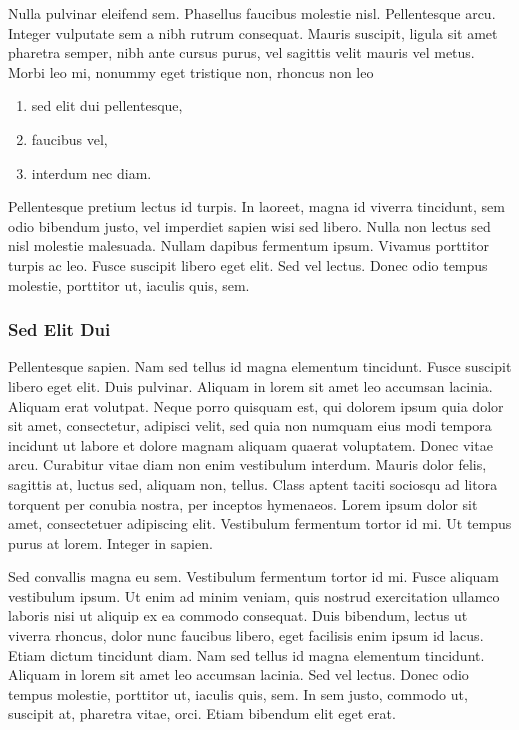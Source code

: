 \documentclass[english,master,dept460,male,cpp,cpdeclaration]{diploma}
\begin{document}
Nulla pulvinar eleifend sem. Phasellus faucibus molestie nisl. Pellentesque arcu. Integer vulputate sem a nibh rutrum consequat. Mauris suscipit, ligula sit amet pharetra semper, nibh ante cursus purus, vel sagittis velit mauris vel metus. Morbi leo mi, nonummy eget tristique non, rhoncus non leo
\begin{enumerate}
	\item sed elit dui pellentesque,
	\item faucibus vel,
	\item interdum nec diam.
\end{enumerate}
Pellentesque pretium lectus id turpis. In laoreet, magna id viverra tincidunt, sem odio bibendum justo, vel imperdiet sapien wisi sed libero. Nulla non lectus sed nisl molestie malesuada. Nullam dapibus fermentum ipsum. Vivamus porttitor turpis ac leo. Fusce suscipit libero eget elit. Sed vel lectus. Donec odio tempus molestie, porttitor ut, iaculis quis, sem.

\subsubsection{Sed Elit Dui}
Pellentesque sapien. Nam sed tellus id magna elementum tincidunt. Fusce suscipit libero eget elit. Duis pulvinar. Aliquam in lorem sit amet leo accumsan lacinia. Aliquam erat volutpat. Neque porro quisquam est, qui dolorem ipsum quia dolor sit amet, consectetur, adipisci velit, sed quia non numquam eius modi tempora incidunt ut labore et dolore magnam aliquam quaerat voluptatem. Donec vitae arcu. Curabitur vitae diam non enim vestibulum interdum. Mauris dolor felis, sagittis at, luctus sed, aliquam non, tellus. Class aptent taciti sociosqu ad litora torquent per conubia nostra, per inceptos hymenaeos. Lorem ipsum dolor sit amet, consectetuer adipiscing elit. Vestibulum fermentum tortor id mi. Ut tempus purus at lorem. Integer in sapien.

Sed convallis magna eu sem. Vestibulum fermentum tortor id mi. Fusce aliquam vestibulum ipsum. Ut enim ad minim veniam, quis nostrud exercitation ullamco laboris nisi ut aliquip ex ea commodo consequat. Duis bibendum, lectus ut viverra rhoncus, dolor nunc faucibus libero, eget facilisis enim ipsum id lacus. Etiam dictum tincidunt diam. Nam sed tellus id magna elementum tincidunt. Aliquam in lorem sit amet leo accumsan lacinia. Sed vel lectus. Donec odio tempus molestie, porttitor ut, iaculis quis, sem. In sem justo, commodo ut, suscipit at, pharetra vitae, orci. Etiam bibendum elit eget erat.
\end{document}
